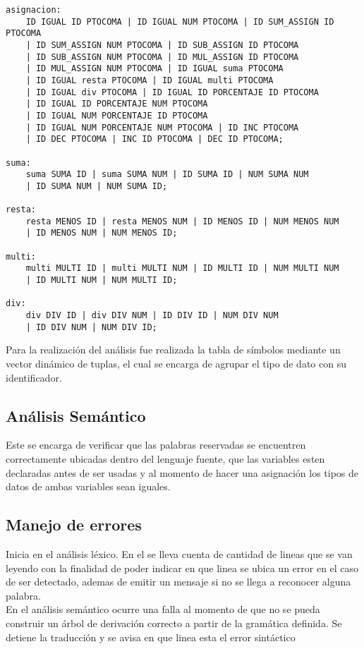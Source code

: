 \documentclass[aspectratio=169]{article}
\begin{document}
\begin{lstlisting}
asignacion:
	ID IGUAL ID PTOCOMA | ID IGUAL NUM PTOCOMA | ID SUM_ASSIGN ID PTOCOMA
	| ID SUM_ASSIGN NUM PTOCOMA | ID SUB_ASSIGN ID PTOCOMA
	| ID SUB_ASSIGN NUM PTOCOMA | ID MUL_ASSIGN ID PTOCOMA
	| ID MUL_ASSIGN NUM PTOCOMA | ID IGUAL suma PTOCOMA
	| ID IGUAL resta PTOCOMA | ID IGUAL multi PTOCOMA
	| ID IGUAL div PTOCOMA | ID IGUAL ID PORCENTAJE ID PTOCOMA
	| ID IGUAL ID PORCENTAJE NUM PTOCOMA
	| ID IGUAL NUM PORCENTAJE ID PTOCOMA
	| ID IGUAL NUM PORCENTAJE NUM PTOCOMA | ID INC PTOCOMA
	| ID DEC PTOCOMA | INC ID PTOCOMA | DEC ID PTOCOMA;

suma:
	suma SUMA ID | suma SUMA NUM | ID SUMA ID | NUM SUMA NUM
	| ID SUMA NUM | NUM SUMA ID;

resta:
	resta MENOS ID | resta MENOS NUM | ID MENOS ID | NUM MENOS NUM
	| ID MENOS NUM | NUM MENOS ID;

multi:
	multi MULTI ID | multi MULTI NUM | ID MULTI ID | NUM MULTI NUM
	| ID MULTI NUM | NUM MULTI ID;

div:
	div DIV ID | div DIV NUM | ID DIV ID | NUM DIV NUM
	| ID DIV NUM | NUM DIV ID;

\end{lstlisting}

	Para la realizaci\'on del an\'alisis fue realizada la tabla de símbolos mediante un vector dinámico de 
	tuplas, el cual se encarga de agrupar el tipo de dato con su identificador.


\subsection{An\'alisis Sem\'antico}

	Este se encarga de verificar que las palabras reservadas se encuentren correctamente ubicadas dentro 
	del lenguaje fuente, que las variables esten declaradas antes de ser usadas y al momento de hacer una 
	asignación los tipos de datos  de ambas variables sean iguales.

\subsection{Manejo de errores}

	Inicia en el análisis léxico. En el se lleva cuenta de cantidad de lineas que se van leyendo con la finalidad de 
	poder indicar en que linea se ubica un error en el caso de ser detectado, ademas de emitir un mensaje si 
	no se llega a reconocer alguna palabra.\\

	En el análisis semántico ocurre una falla al momento de que no se pueda construir un árbol de 
	derivación correcto a partir de la gramática definida. Se detiene la traducción y se avisa en que linea 
	esta el error sintáctico\\
\end{document}
